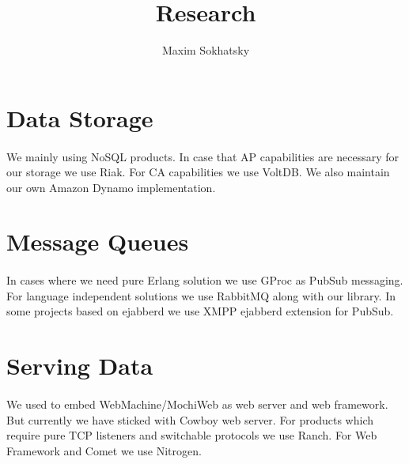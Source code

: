 \documentclass[11pt]{article}
\begin{document}
\title{Research}
\author{Maxim Sokhatsky}

\section*{Data Storage}
\paragraph{}
    We mainly using NoSQL products. In case that AP capabilities are necessary
    for our storage we use Riak. For CA capabilities we use VoltDB.
    We also maintain our own Amazon Dynamo implementation.
\section*{Message Queues}
\paragraph{}
    In cases where we need pure Erlang solution we use GProc as PubSub messaging.
    For language independent solutions we use RabbitMQ along with our library.
    In some projects based on ejabberd we use XMPP ejabberd extension for PubSub.
\section*{Serving Data}
\paragraph{}
    We used to embed WebMachine/MochiWeb as web server and web framework.
    But currently we have sticked with Cowboy web server.
    For products which require pure TCP listeners and switchable protocols we use Ranch.
    For Web Framework and Comet we use Nitrogen.
\end{document}
